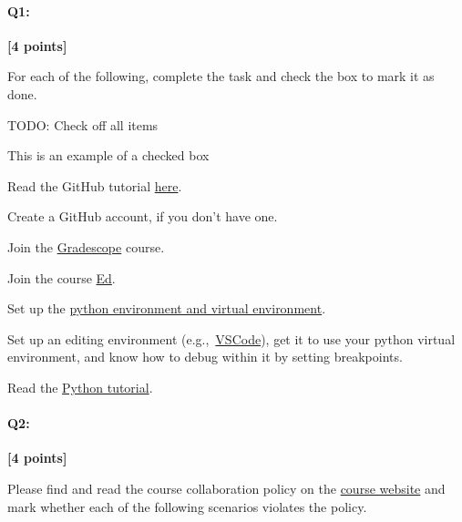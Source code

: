 \documentclass[11pt]{article}
\newcommand{\cmark}{\ding{51}}%
\newcommand{\done}{\rlap{$\square$}{\raisebox{2pt}{\large\hspace{1pt}\cmark}}%
\hspace{-2.5pt}}
\begin{document}
\pagebreak


\paragraph{Q1:} \textbf{[4 points]}
\begin{tcolorbox}[colback=orange!5!white,colframe=orange!75!black]
For each of the following, complete the task and check the box to mark it as done.
\end{tcolorbox}

\begin{tcolorbox}[colback=white!5!white,colframe=green!75!black]
TODO: Check off all items %

\begin{todolist}
    \item[\done] This is an example of a checked box
    \item Read the GitHub tutorial \href{https://browncsci1430.github.io/webpage/resources/github_guide/}{here}.
    \item Create a GitHub account, if you don't have one.
    \item Join the \href{https://www.gradescope.com/}{Gradescope} course.
    \item Join the course \href{https://edstem.org/us/courses/28039/discussion/}{Ed}.
    \item Set up the \href{https://browncsci1430.github.io/webpage/resources/python_setup/}{python environment and virtual environment}.
    \item Set up an editing environment (e.g.,~\href{https://browncsci1430.github.io/webpage/resources/vscode_ssh/}{VSCode}), get it to use your python virtual environment, and know how to debug within it by setting breakpoints.
    \item Read the \href{https://browncsci1430.github.io/webpage/resources/python_tutorial/}{Python tutorial}.
\end{todolist}
\end{tcolorbox}

\pagebreak

\paragraph{Q2:} 
\textbf{[4 points]}
\begin{tcolorbox}[colback=orange!5!white,colframe=orange!75!black]
Please find and read the course collaboration policy on the \href{https://browncsci1430.github.io/webpage/policies/}{course website} and mark whether each of the following scenarios violates the policy.
\end{tcolorbox}
\end{document}
